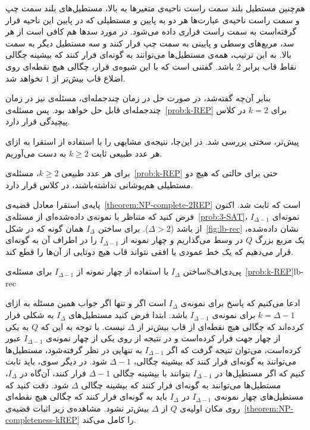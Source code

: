 هم‌چنین مستطیل بلند سمت راست ناحیه‌ی متغیر‌ها به بالا، مستطیل‌های بلند سمت چپ و سمت راست ناحیه‌ی عبارت‌ها هر دو به پایین و مستطیلی که در پایین این ناحیه قرار گرفته‌است به سمت راست فراری داده می‌شود. در مورد سد‌ها هم کافی است از هر سد، مربع‌های وسطی و پایینی به سمت چپ فرار کنند و سه مستطیل دیگر به سمت بالا. به این ترتیب، همه‌ی مستطیل‌ها می‌توانند به گونه‌ای فرار کنند که بیشینه چگالی نقاط قاب برابر $2$ باشد. گفتنی است که با این شیوه‌ی فرار، چگالی هیچ نقطه‌ای روی اضلاع قاب بیش‌تر از $1$ نخواهد شد.

بنابر آن‌چه گفته‌شد، در صورت حل  در زمان چند‌جمله‌ای، مسئله‌ی  نیز در زمان چند‌جمله‌ای قابل حل خواهد بود. پس مسئله‌ی~\ref{prob:k-REP} برای $k = 2$ در کلاس پیچیدگی  قرار دارد.



پیش‌تر، سختی  بررسی شد. در این‌جا، نتیجه‌ی مشابهی را با استفاده از استقرا به ازای هر عدد طبیعی ثابت $k \geq 2$ به دست می‌آوریم.

\label{theorem:NP-completeness-kREP}
برای هر عدد طبیعی $k \geq 2$، مسئله‌ی~\ref{prob:k-REP} حتی برای حالتی که هیچ دو مستطیلی هم‌پوشانی نداشته‌باشند، در کلاس  قرار دارد.



پایه‌ی استقرا معادل قضیه‌ی~\ref{theorem:NP-complete-2REP} است که ثابت شد. اکنون فرض کنید که متناظر با نمونه‌ی داده‌شده‌ای از مسئله‌ی~\ref{prob:3-SAT}، $I_{\Delta - 1}$ نمونه‌ای از  باشد ($\Delta > 2$). برای ساختن $I_{\Delta}$ همان گونه که در شکل~\ref{fig:lb-rec} نشان داده‌شده، یک مربع بزرگ $Q$ در وسط می‌گذاریم و چهار نمونه از $I_{\Delta - 1}$  را در اطراف آن به گونه‌ای قرار می‌دهیم که یک خط عمودی یا افقی نتواند قاب هیچ دوتایی از آن‌ها را قطع کند.

‌پی‌دی‌اف{8}{ساختن $I_{\Delta}$ با استفاده از چهار نمونه از $I_{\Delta - 1}$ برای مسئله‌ی~\ref{prob:k-REP}}{lb-rec}

ادعا می‌کنیم که
پاسخ \decision{\Delta} برای نمونه‌ی $I_{\Delta}$ 
 است اگر و تنها اگر جواب همین مسئله به ازای $k = \Delta - 1$ برای نمونه‌ی $I_{\Delta - 1}$
 باشد.
ابتدا فرض کنید مستطیل‌های $I_{\Delta}$ به شکلی فرار کرده‌اند که چگالی هیچ نقطه‌ای از قاب بیش‌تر از $\Delta$ نیست. با توجه به این که $Q$ به یکی از چهار جهت فرار کرده‌است و در نتیجه از روی یکی از چهار نمونه‌ی $I_{\Delta - 1}$ عبور کرده‌است، می‌توان نتیجه گرفت که اگر $I_{\Delta - 1}$ به تنهایی در نظر گرفته‌شود، مستطیل‌ها می‌توانند به گونه‌ای فرار کنند که بیشینه چگالی، $\Delta - 1$ شود. در دیگر سوی، باید ثابت کنیم که اگر مستطیل‌ها در $I_{\Delta - 1}$ بتوانند با بیشینه چگالی $\Delta - 1$ فرار کنند، آن‌گاه در $I_{\Delta}$، مستطیل‌ها می‌توانند به گونه‌ای فرار کنند که بیشینه چگالی $\Delta$ شود. دقت کنید که مستطیل‌های چهار نمونه‌ی $I_{\Delta - 1}$ در $I_{\Delta}$ باید به گونه‌ای فرار کنند که چگالی هیچ نقطه‌ای روی مکان اولیه‌ی $Q$ از $\Delta$ بیش‌تر نشود. مشاهده‌ی زیر اثبات قضیه‌ی~\ref{theorem:NP-completeness-kREP} را کامل می‌کند.

